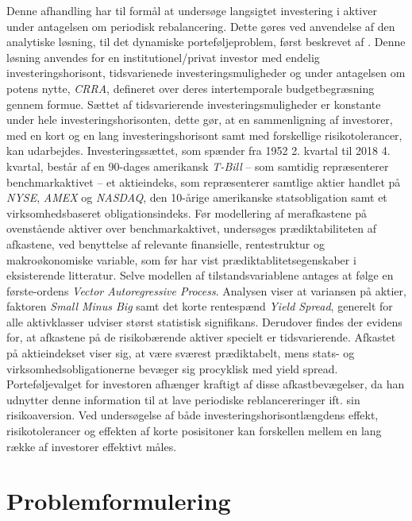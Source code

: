 \documentclass[
  a4paper,
  oneside]{memoir}
\begin{document}
Denne afhandling har til formål at undersøge langsigtet investering i aktiver under antagelsen om periodisk rebalancering. Dette gøres ved anvendelse af den analytiske løsning, til det dynamiske porteføljeproblem, først beskrevet af \citep{JurVic2011}. Denne løsning anvendes for en institutionel/privat investor med endelig investeringshorisont, tidsvarienede investeringsmuligheder og under antagelsen om potens nytte, \emph{CRRA}, defineret over deres intertemporale budgetbegræsning gennem formue. Sættet af tidsvarierende investeringsmuligheder er konstante under hele investeringshorisonten, dette gør, at en sammenligning af investorer, med en kort og en lang investeringshorisont samt med forskellige risikotolerancer, kan udarbejdes. Investeringssættet, som spænder fra 1952 2. kvartal til 2018 4. kvartal, består af en 90-dages amerikansk \emph{T-Bill} -- som samtidig repræsenterer benchmarkaktivet -- et aktieindeks, som repræsenterer samtlige aktier handlet på \emph{NYSE}, \emph{AMEX} og \emph{NASDAQ}, den 10-årige amerikanske statsobligation samt et virksomhedsbaseret obligationsindeks. Før modellering af merafkastene på ovenstående aktiver over benchmarkaktivet, undersøges prædiktabiliteten af afkastene, ved benyttelse af relevante finansielle, rentestruktur og makroøkonomiske variable, som før har vist prædiktablitetsegenskaber i eksisterende litteratur. Selve modellen af tilstandsvariablene antages at følge en første-ordens \emph{Vector Autoregressive Process}. Analysen viser at variansen på aktier, faktoren \emph{Small Minus Big} samt det korte rentespænd \emph{Yield Spread}, generelt for alle aktivklasser udviser størst statistisk signifikans. Derudover findes der evidens for, at afkastene på de risikobærende aktiver specielt er tidsvarierende. Afkastet på aktieindekset viser sig, at være sværest prædiktabelt, mens stats- og virksomhedsobligationerne bevæger sig procyklisk med yield spread. Porteføljevalget for investoren afhænger kraftigt af disse afkastbevægelser, da han udnytter denne information til at lave periodiske reblancereringer ift. sin risikoaversion. Ved undersøgelse af både investeringshorisontlængdens effekt, risikotolerancer og effekten af korte posisitoner kan forskellen mellem en lang række af investorer effektivt måles.

\hypertarget{problemformulering}{%
\section{Problemformulering}\label{problemformulering}}
\end{document}

